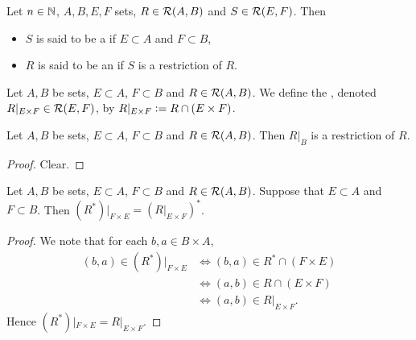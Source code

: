 \begin{defn}
	Let $n \in \mathbb{N}$, $A, B, E, F$ sets, $R \in \mathcal{R}(A, B)$ and $S \in \mathcal{R}(E, F)$. Then 
	\begin{itemize}
		\item $S$ is said to be a  if $E \subset A$ and $F \subset B$,    
		\item $R$ is said to be an  if $S$ is a restriction of $R$.
	\end{itemize}
\end{defn}

\begin{defn}
	Let $A,B$ be sets, $E \subset A$, $F \subset B$ and $R \in \mathcal{R}(A,B)$. We define the , denoted $R|_{E \times F} \in \mathcal{R}(E, F)$, by $R|_{E \times F} \vcentcolon= R \cap (E \times F)$.
\end{defn}

\begin{ex}
	Let $A, B$ be sets, $E \subset A$, $F \subset B$ and $R \in \mathcal{R}(A, B)$. Then $R|_B$ is a restriction of $R$.
\end{ex}

\begin{proof}
	Clear. 
\end{proof}



\begin{ex}
	Let $A, B$ be sets, $E \subset A$, $F \subset B$ and $R \in \mathcal{R}(A,B)$. Suppose that $E \subset A$ and $F \subset B$. Then $(R^*)|_{F \times E} = (R|_{E \times F})^*$.
\end{ex}

\begin{proof}
	We note that for each $b,a \in B \times A$,
	\begin{align*}
		(b,a) \in (R^*)|_{F \times E}
		& \iff (b, a) \in R^* \cap (F \times E) \\
		& \iff (a, b) \in R \cap (E \times F) \\
		& \iff (a, b) \in R|_{E \times F}.
	\end{align*}
	Hence $(R^*)|_{F \times E} = R|_{E \times F}$.
\end{proof}





























